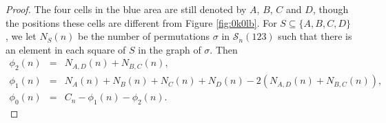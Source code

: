 \documentclass[
final,nomarks
]{dmtcs-episciences}
\newcommand{\fref}[1]{Figure \ref{fig:#1}}
\newcommand{\Sn}[1]{\mathcal{S}_{#1}}
\begin{document}
\begin{proof}
	
	
	The four cells in the blue area are still denoted by \begin{math}A\end{math}, \begin{math}B\end{math}, \begin{math}C\end{math} and \begin{math}D\end{math}, though the positions 
	these cells are different from \fref{0k0lb}. For 
	\begin{math}S \subseteq  \{A,B,C,D\}\end{math}, we let \begin{math}N_S(n)\end{math} be the number of permutations \begin{math}\sigma\end{math} in \begin{math}\Sn{n}(123)\end{math} such 
	that there is an element in each square of  \begin{math}S\end{math} in the graph of \begin{math}\sigma\end{math}. Then 
	\begin{eqnarray}
		\phi_2(n)&=&N_{A,D}(n)+N_{B,C}(n),\\
		\phi_1(n)&=&N_A(n)+N_{B}(n)+N_{C}(n)+N_{D}(n)-2(N_{A,D}(n)+N_{B,C}(n)),\\
		\phi_0(n)&=&C_n-\phi_1(n)-\phi_2(n).
	\end{eqnarray}
	

\end{proof}
\end{document}
